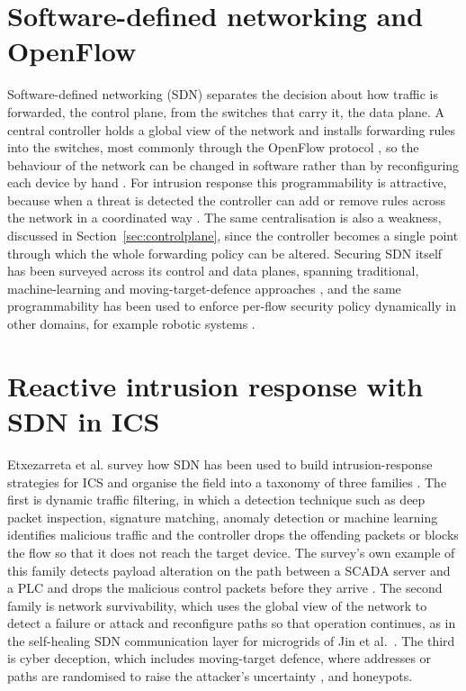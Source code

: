 \section{Software-defined networking and OpenFlow}
\label{sec:sdn}

Software-defined networking (SDN) separates the decision about how traffic is forwarded, the control plane, from the switches that carry it, the data plane. A central controller holds a global view of the network and installs forwarding rules into the switches, most commonly through the OpenFlow protocol \cite{onf2012openflow13}, so the behaviour of the network can be changed in software rather than by reconfiguring each device by hand \cite{lara2014openflow}. For intrusion response this programmability is attractive, because when a threat is detected the controller can add or remove rules across the network in a coordinated way \cite{etxezarreta2023survey}. The same centralisation is also a weakness, discussed in Section~\ref{sec:controlplane}, since the controller becomes a single point through which the whole forwarding policy can be altered. Securing SDN itself has been surveyed across its control and data planes, spanning traditional, machine-learning and moving-target-defence approaches \cite{abdi2024sdnreview}, and the same programmability has been used to enforce per-flow security policy dynamically in other domains, for example robotic systems \cite{rivera2019rosdefender}.

\section{Reactive intrusion response with SDN in ICS}
\label{sec:reactive}

Etxezarreta et al. survey how SDN has been used to build intrusion-response strategies for ICS and organise the field into a taxonomy of three families \cite{etxezarreta2023survey}. The first is dynamic traffic filtering, in which a detection technique such as deep packet inspection, signature matching, anomaly detection or machine learning identifies malicious traffic and the controller drops the offending packets or blocks the flow so that it does not reach the target device. The survey's own example of this family detects payload alteration on the path between a SCADA server and a PLC and drops the malicious control packets before they arrive \cite{etxezarreta2023survey}. The second family is network survivability, which uses the global view of the network to detect a failure or attack and reconfigure paths so that operation continues, as in the self-healing SDN communication layer for microgrids of Jin et al.\ \cite{jin2017microgrid}. The third is cyber deception, which includes moving-target defence, where addresses or paths are randomised to raise the attacker's uncertainty \cite{lakshminarayana2024mtd}, and honeypots.

